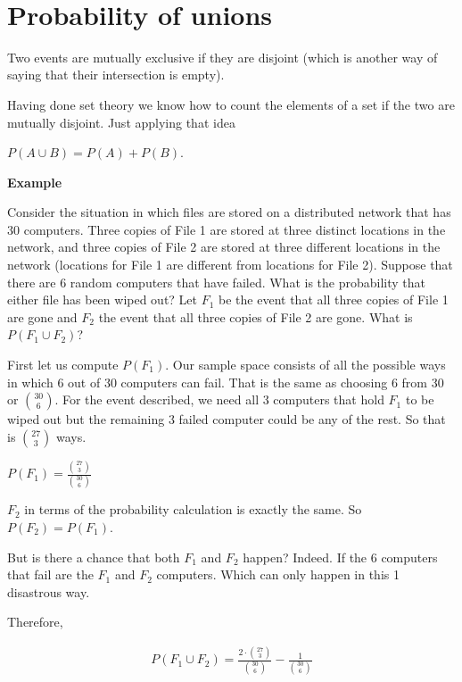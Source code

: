 \documentclass[12pt]{article}
\begin{document}
\begin{center}
\\
\vspace{1cm}
\end{center}

\vspace{0.5cm}\noindent

\section*{Probability of unions}
Two events are mutually exclusive if they are disjoint (which is another way of saying that their intersection is empty).

Having done set theory we know how to count the elements of a set if the two are mutually disjoint. 
Just applying that idea

$P(A \cup B) = P(A) + P(B)$.

\medskip

\textbf{Example}

Consider the situation in which files are stored on a distributed network that has 30 computers. Three copies of File 1 are stored at three distinct locations in the network, and three copies of File 2 are stored at three different locations in the network (locations for File 1 are different from locations for File 2). Suppose that there are 6 random computers that have failed. What is the probability that either file has been wiped out? Let $F_1$ be the event that all three copies of File 1 are gone and $F_2$ the event that all three copies of File 2 are gone. What is $P(F_1 \cup F_2)$?

First let us compute $P(F_1)$. Our sample space consists of all the possible ways in which 6 out of 30 computers can fail. That is the same as choosing 6 from 30 or $30 \choose 6$. For the event described, we need all 3 computers that hold $F_1$ to be wiped out but the remaining 3 failed computer could be any of the rest. So that is $27 \choose 3$ ways.

$P(F_1) = \frac{{27 \choose 3}}{{30 \choose 6}}$

$F_2$ in terms of the probability calculation is exactly the same. So $P(F_2) = P(F_1)$.

But is there a chance that both $F_1$ and $F_2$ happen? Indeed. If the 6 computers that fail are the $F_1$ and $F_2$ computers. Which can only happen in this 1 disastrous way.

Therefore,

\begin{align*}
P(F_1 \cup F_2) = \frac{2 \cdot \binom{27}{3}}{\binom{30}{6}} - \frac{1}{\binom{30}{6}}
\end{align*}
\end{document}
